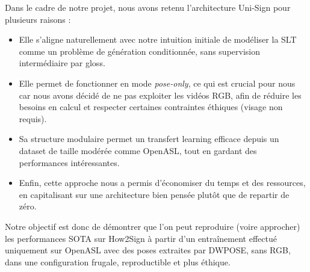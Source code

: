 Dans le cadre de notre projet, nous avons retenu l’architecture Uni-Sign pour plusieurs raisons :
\begin{itemize}
    \item Elle s’aligne naturellement avec notre intuition initiale de modéliser la SLT comme un problème de génération conditionnée, sans supervision intermédiaire par gloss.
    \item Elle permet de fonctionner en mode \textit{pose-only}, ce qui est crucial pour nous car nous avons décidé de ne pas exploiter les vidéos RGB, afin de réduire les besoins en calcul et respecter certaines contraintes éthiques (visage non requis).
    \item Sa structure modulaire permet un transfert learning efficace depuis un dataset de taille modérée comme OpenASL, tout en gardant des performances intéressantes.
    \item Enfin, cette approche nous a permis d’économiser du temps et des ressources, en capitalisant sur une architecture bien pensée plutôt que de repartir de zéro.
\end{itemize}

Notre objectif est donc de démontrer que l’on peut reproduire (voire approcher) les performances SOTA sur How2Sign à partir d’un entraînement effectué uniquement sur OpenASL avec des poses extraites par DWPOSE, sans RGB, dans une configuration frugale, reproductible et plus éthique.
